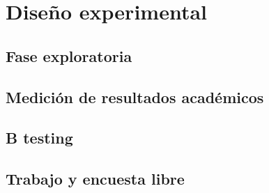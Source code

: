 \section{Diseño experimental}

\subsection{Fase exploratoria}

\subsection{Medición de resultados académicos}

\subsection{B testing}

\subsection{Trabajo y encuesta libre}

